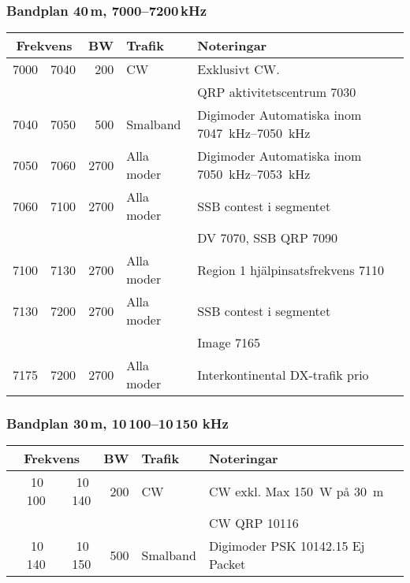 \subsubsection{Bandplan 40\,m, 7000--7200\,kHz}
\begin{tabular}{rrrll}
\multicolumn{2}{c}{\textbf{Frekvens}} & \textbf{BW} & \textbf{Trafik} & \textbf{Noteringar} \\ \hline

7000 & 7040 & 200  & CW         & Exklusivt CW.                                        \\
     &      &      &            & QRP aktivitetscentrum \SI{7030}{}                    \\ \hline
7040 & 7050 & 500  & Smalband   & Digimoder Automatiska inom \SIrange{7047}{7050}{\kilo\hertz} \\ \hline
7050 & 7060 & 2700 & Alla moder & Digimoder Automatiska inom \SIrange{7050}{7053}{\kilo\hertz} \\ \hline
7060 & 7100 & 2700 & Alla moder & SSB contest i segmentet                              \\
     &      &      &            & DV \num{7070}, SSB QRP \num{7090}                    \\ \hline
7100 & 7130 & 2700 & Alla moder & Region 1 hjälpinsatsfrekvens \num{7110}           \\ \hline
7130 & 7200 & 2700 & Alla moder & SSB contest i segmentet                              \\
     &      &      &            & Image \num{7165}                                     \\ \hline
7175 & 7200 & 2700 & Alla moder & Interkontinental DX-trafik prio                      \\ \hline

\end{tabular}
\subsubsection{Bandplan 30\,m, 10\,100--10\,150 kHz}
\begin{tabular}{rrrll}
\multicolumn{2}{c}{\textbf{Frekvens}} & \textbf{BW} & \textbf{Trafik} & \textbf{Noteringar} \\ \hline

10\,100 & 10\,140 & 200 & CW       & CW exkl. Max \SI{150}{\watt} på \SI{30}{m} \\
        &         &     &          & CW QRP \num{10116}                     \\ \hline
10\,140 & 10\,150 & 500 & Smalband & Digimoder PSK \num{10142,15} Ej Packet \\ \hline
\end{tabular}

